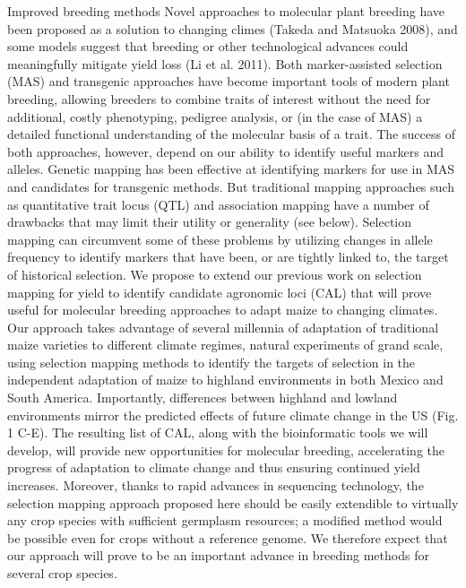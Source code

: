 Improved breeding methods
Novel approaches to molecular plant breeding have been proposed as a solution to changing climes (Takeda and Matsuoka 2008), and some models suggest that breeding or other technological advances could meaningfully mitigate yield loss (Li et al. 2011).  Both marker-assisted selection (MAS) and transgenic approaches have become important tools of modern plant breeding, allowing breeders to combine traits of interest without the need for additional, costly phenotyping, pedigree analysis, or (in the case of MAS) a detailed functional understanding of the molecular basis of a trait. The success of both approaches, however, depend on our ability to identify useful markers and alleles.  Genetic mapping has been effective at identifying markers for use in MAS and candidates for transgenic methods.  But traditional mapping approaches such as quantitative trait locus (QTL) and association mapping have a number of drawbacks that may limit their utility or generality (see below). 
Selection mapping can circumvent some of these problems by utilizing changes in allele frequency to identify markers that have been, or are tightly linked to, the target of historical selection. We propose to extend our previous work on selection mapping for yield to identify candidate agronomic loci (CAL) that will prove useful for molecular breeding approaches to adapt maize to changing climates. Our approach takes advantage of several millennia of adaptation of traditional maize varieties to different climate regimes, natural experiments of grand scale, using selection mapping methods to identify the targets of selection in the independent adaptation of maize to highland environments in both Mexico and South America.  Importantly, differences between highland and lowland environments mirror the predicted effects of future climate change in the US (Fig. 1 C-E).  The resulting list of CAL, along with the bioinformatic tools we will develop, will provide new opportunities for molecular breeding, accelerating the progress of adaptation to climate change and thus ensuring continued yield increases.  Moreover, thanks to rapid advances in sequencing technology, the selection mapping approach proposed here should be easily extendible to virtually any crop species with sufficient germplasm resources; a modified method would be possible even for crops without a reference genome.  We therefore expect that our approach will prove to be an important advance in breeding methods for several crop species.

